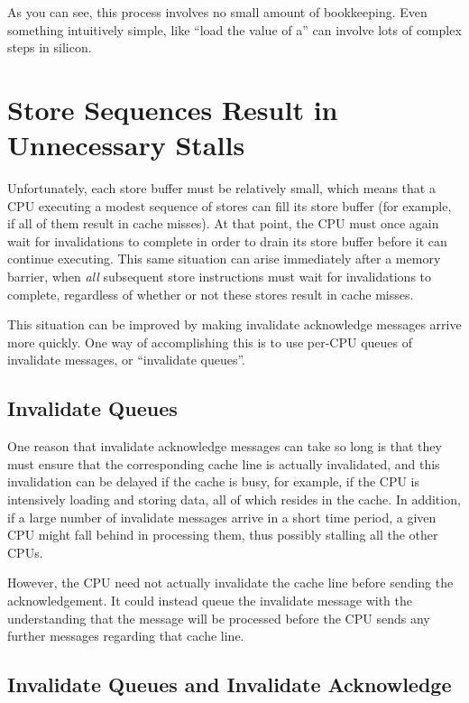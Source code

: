 As you can see, this process involves no small amount of bookkeeping.
Even something intuitively simple, like ``load the value of a'' can
involve lots of complex steps in silicon.

\section{Store Sequences Result in Unnecessary Stalls}
\label{sec:app:whymb:Store Sequences Result in Unnecessary Stalls}

Unfortunately, each store buffer must be relatively small, which means
that a CPU executing a modest sequence of stores can fill its store
buffer (for example, if all of them result in cache misses).
At that point, the CPU must once again wait for invalidations to complete
in order to drain its store buffer before it can continue executing.
This same situation can arise immediately after a memory barrier, when
\emph{all} subsequent store instructions must wait for invalidations to
complete, regardless of whether or not these stores result in cache misses.

This situation can be improved by making invalidate acknowledge
messages arrive more quickly.
One way of accomplishing this is to use per-CPU queues of
invalidate messages, or ``invalidate queues''.

\subsection{Invalidate Queues}
\label{sec:app:whymb:Invalidate Queues}

One reason that invalidate acknowledge messages can take so long
is that they must ensure that the corresponding cache line is
actually invalidated, and this invalidation can be delayed if
the cache is busy, for example, if the CPU is intensively loading
and storing data, all of which resides in the cache.
In addition, if a large number of invalidate messages arrive
in a short time period, a given CPU might fall behind in processing
them, thus possibly stalling all the other CPUs.

However, the CPU need not actually invalidate the cache line
before sending the acknowledgement.
It could instead queue the invalidate message with the understanding
that the message will be processed before the CPU sends any further
messages regarding that cache line.

\subsection{Invalidate Queues and Invalidate Acknowledge}
\label{sec:app:whymb:Invalidate Queues and Invalidate Acknowledge}

